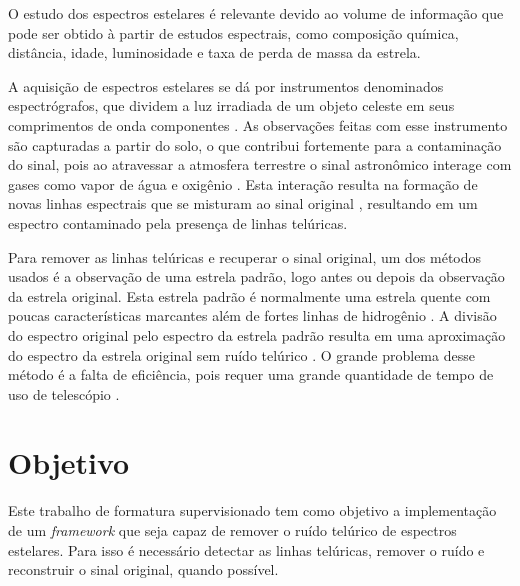 \documentclass[11pt,twoside,a4paper]{article}
\begin{document}
O estudo dos espectros estelares é relevante devido ao volume de informação que pode ser obtido à partir de estudos espectrais, como composição química, distância, idade, luminosidade e taxa de perda de massa da estrela\cite{wiki:astro_spectroscopy}.



\par A aquisição de espectros estelares se dá por instrumentos denominados espectrógrafos, que dividem a luz irradiada de um objeto celeste em seus comprimentos de onda componentes \cite{spectrograph_aus}. As observações feitas com esse instrumento são capturadas a partir do solo, o que contribui fortemente para a contaminação do sinal, pois ao atravessar a atmosfera terrestre o sinal astronômico interage com gases como vapor de água e oxigênio \cite{seifahrt2010precise}. Esta interação resulta na formação de novas linhas espectrais que se misturam ao sinal original \cite{catanzaro1997high}, resultando em um espectro contaminado pela presença de linhas telúricas. 

\par Para remover as linhas telúricas e recuperar o sinal original, um dos métodos usados é a observação de uma estrela padrão, logo antes ou depois da observação da estrela original. Esta estrela padrão é normalmente uma estrela quente com poucas características marcantes além de fortes linhas de hidrogênio \cite{seifahrt2010precise}. A divisão do espectro original pelo espectro da estrela padrão resulta em uma aproximação do espectro da estrela original sem ruído telúrico \cite{rudolf2016modelling}. O grande problema desse método é a falta de eficiência, pois requer uma grande quantidade de tempo de uso de telescópio \cite{seifahrt2010precise}. 

\section{Objetivo}
\doublespacing
Este trabalho de formatura supervisionado tem como objetivo a implementação  de um \textit{framework} que seja capaz de remover o ruído telúrico de espectros estelares. Para isso é necessário detectar as linhas telúricas, remover o ruído e reconstruir o sinal original, quando possível. 
\end{document}
